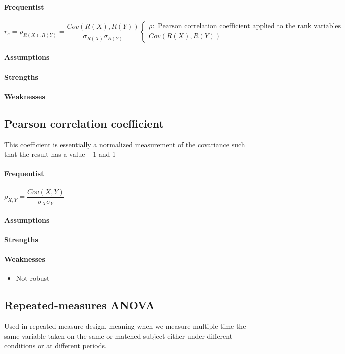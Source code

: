 \paragraph{Frequentist}
$r_{s} = \rho_{R(X), R(Y)} = \dfrac{Cov\left(R(X), R(Y)\right)}{\sigma_{R(X)}\sigma_{R(Y)}}
\begin{cases}
\rho:\text{ Pearson correlation coefficient applied to the rank variables} \\
Cov\left(R(X), R(Y)\right)
\end{cases}$
\paragraph{Assumptions}
\paragraph{Strengths}
\paragraph{Weaknesses}

\subsection{Pearson correlation coefficient}
This coefficient is essentially a normalized measurement of the covariance such that the result
has a value $-1$ and 1
\paragraph{Frequentist}
$\rho_{X, Y} = \dfrac{Cov\left(X, Y\right)}{\sigma_{X}\sigma_{Y}}$
\paragraph{Assumptions}
\paragraph{Strengths}
\paragraph{Weaknesses}
\begin{itemize}
    \item Not robust
\end{itemize}

\subsection{Repeated-measures ANOVA}
Used in repeated measure design, meaning when we measure multiple time the same variable
taken on the same or matched subject either under different conditions or at different periods.
